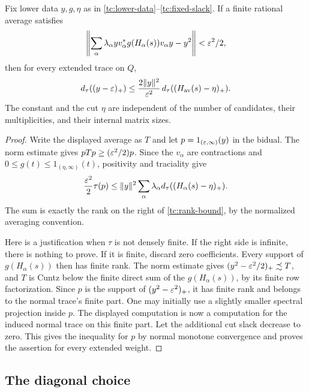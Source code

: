 \begin{lemma}\label{tc:rank-average}
Fix lower data $y,g,\eta$ as in
\eqref{tc:lower-data}--\eqref{tc:fixed-slack}.  If a finite rational
average satisfies
\[
 \left\|\sum_\alpha\lambda_\alpha
       yv_\alpha^*g(H_\alpha(s))v_\alpha y-y^2\right\|
       <\varepsilon^2/2,
\]
then for every extended trace on $Q$,
\begin{equation}\label{tc:rank-bound}
 d_\tau((y-\varepsilon)_+)
   \leq \frac{2\|y\|^2}{\varepsilon^2}\,
        d_\tau((H_{\mathrm{av}}(s)-\eta)_+).
\end{equation}
The constant and the cut $\eta$ are independent of the number of
candidates, their multiplicities, and their internal matrix sizes.
\end{lemma}

\begin{proof}
Write the displayed average as $T$ and let
$p=1_{(\varepsilon,\infty)}(y)$ in the bidual.  The norm estimate gives
$pTp\geq(\varepsilon^2/2)p$.  Since the $v_\alpha$ are contractions and
$0\leq g(t)\leq1_{(\eta,\infty)}(t)$, positivity and traciality give
\[
 \frac{\varepsilon^2}{2}\tau(p)
 \leq \|y\|^2\sum_\alpha\lambda_\alpha
       d_\tau((H_\alpha(s)-\eta)_+).
\]
The sum is exactly the rank on the right of
\eqref{tc:rank-bound}, by the normalized averaging convention.

Here is a justification when $\tau$ is not densely finite.  If the
right side is infinite, there is nothing to prove.  If it is finite,
discard zero coefficients.  Every support of $g(H_\alpha(s))$ then
has finite rank. The norm estimate gives
$(y^2-\varepsilon^2/2)_+\precsim T$, and $T$ is Cuntz below the finite
direct sum of the $g(H_\alpha(s))$, by its finite row factorization.
Since $p$ is the support of $(y^2-\varepsilon^2)_+$, it has finite rank
and belongs to the normal trace's finite part. One may initially
use a slightly smaller spectral projection inside $p$.
The displayed computation is now a computation for the induced
normal trace on this finite part.  Let the additional cut slack decrease to zero.  This gives
the inequality for $p$ by normal monotone convergence and proves
the assertion for every extended weight.
\end{proof}

\subsection{The diagonal choice}

